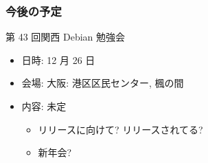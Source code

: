 \documentclass[cjk,dvipdfmx,12pt,%
hyperref={bookmarks=true,bookmarksnumbered=true,bookmarksopen=false,%
colorlinks=false,%
pdftitle={第 42 回 関西 Debian 勉強会},%
pdfauthor={倉敷・のがた・佐々木},%
pdfsubject={資料},%
}]{beamer}
\begin{document}
\begin{frame}[fragile]
\frametitle{今後の予定}


\begin{block}{第 43 回関西 Debian 勉強会}
\begin{itemize}
  \item 日時: 12 月 26 日
  \item 会場: 大阪: 港区区民センター, 楓の間
  \item 内容: 未定
  \begin{itemize}
    \item リリースに向けて? リリースされてる?
    \item 新年会?
  \end{itemize}
\end{itemize}
\end{block}


\end{frame}



\takahashi[50]{  }
\end{document}
